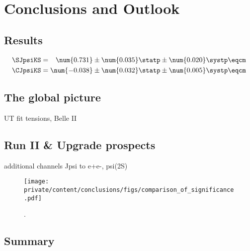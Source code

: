 
\chapter{Conclusions and Outlook}
\label{ch:conclusion}


\section{Results}
\label{sec:conclusion:results}

\begin{equation*}
  \begin{split}
    \SJpsiKS &= \phantom{-}\num{0.731} \pm \num{0.035} \statp \pm \num{0.020} \systp \eqcm \\
    \CJpsiKS &= \num{-0.038} \pm \num{0.032} \statp \pm \num{0.005} \systp \eqcm
  \end{split}
\end{equation*}

\section{The global picture}
\label{sec:conclusion:global_picture}

UT fit tensions, Belle II

\section{Run II \& Upgrade prospects}
\label{sec:conclusion:upgrade}
additional channels Jpsi to e+e-, psi(2S)

\begin{figure}
  \centering
  \texttt{[image: private/content/conclusions/figs/comparison\_of\_significance.pdf]}
  \caption{. \cite{Moedden:2015}}
  \label{fig:conclusion:upgrade:significance}
\end{figure}

\section{Summary}
\label{sec:conclusion:summary}